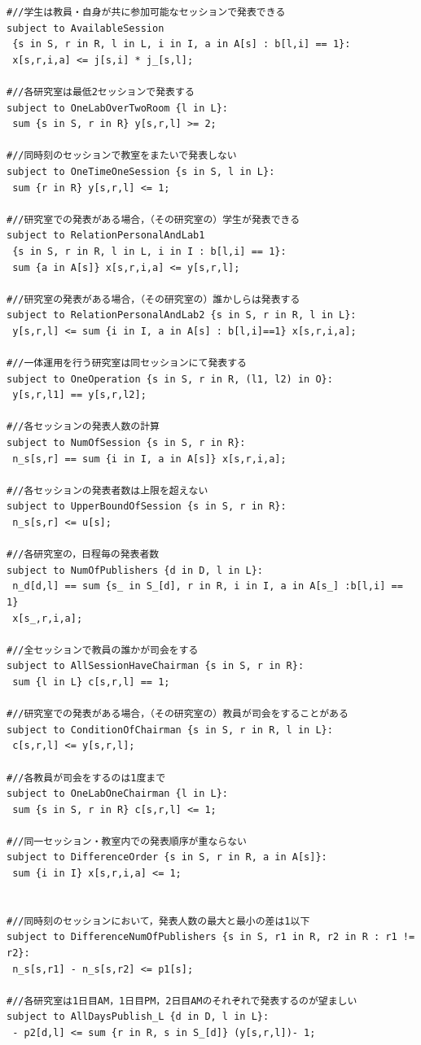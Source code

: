 \documentclass[a4paper,12pt,fleqn]{jarticle}
\begin{document}
\begin{verbatim}
#//学生は教員・自身が共に参加可能なセッションで発表できる
subject to AvailableSession
 {s in S, r in R, l in L, i in I, a in A[s] : b[l,i] == 1}:
 x[s,r,i,a] <= j[s,i] * j_[s,l];

#//各研究室は最低2セッションで発表する
subject to OneLabOverTwoRoom {l in L}:
 sum {s in S, r in R} y[s,r,l] >= 2;

#//同時刻のセッションで教室をまたいで発表しない
subject to OneTimeOneSession {s in S, l in L}:
 sum {r in R} y[s,r,l] <= 1;

#//研究室での発表がある場合，（その研究室の）学生が発表できる
subject to RelationPersonalAndLab1
 {s in S, r in R, l in L, i in I : b[l,i] == 1}:
 sum {a in A[s]} x[s,r,i,a] <= y[s,r,l];

#//研究室の発表がある場合，（その研究室の）誰かしらは発表する
subject to RelationPersonalAndLab2 {s in S, r in R, l in L}:
 y[s,r,l] <= sum {i in I, a in A[s] : b[l,i]==1} x[s,r,i,a];

#//一体運用を行う研究室は同セッションにて発表する
subject to OneOperation {s in S, r in R, (l1, l2) in O}:
 y[s,r,l1] == y[s,r,l2];

#//各セッションの発表人数の計算
subject to NumOfSession {s in S, r in R}:
 n_s[s,r] == sum {i in I, a in A[s]} x[s,r,i,a];

#//各セッションの発表者数は上限を超えない
subject to UpperBoundOfSession {s in S, r in R}:
 n_s[s,r] <= u[s];

#//各研究室の，日程毎の発表者数
subject to NumOfPublishers {d in D, l in L}:
 n_d[d,l] == sum {s_ in S_[d], r in R, i in I, a in A[s_] :b[l,i] == 1}
 x[s_,r,i,a];

#//全セッションで教員の誰かが司会をする
subject to AllSessionHaveChairman {s in S, r in R}:
 sum {l in L} c[s,r,l] == 1;

#//研究室での発表がある場合，（その研究室の）教員が司会をすることがある
subject to ConditionOfChairman {s in S, r in R, l in L}:
 c[s,r,l] <= y[s,r,l];

#//各教員が司会をするのは1度まで
subject to OneLabOneChairman {l in L}:
 sum {s in S, r in R} c[s,r,l] <= 1;

#//同一セッション・教室内での発表順序が重ならない
subject to DifferenceOrder {s in S, r in R, a in A[s]}:
 sum {i in I} x[s,r,i,a] <= 1;

	
#//同時刻のセッションにおいて，発表人数の最大と最小の差は1以下
subject to DifferenceNumOfPublishers {s in S, r1 in R, r2 in R : r1 != r2}:
 n_s[s,r1] - n_s[s,r2] <= p1[s];

#//各研究室は1日目AM，1日目PM，2日目AMのそれぞれで発表するのが望ましい
subject to AllDaysPublish_L {d in D, l in L}:
 - p2[d,l] <= sum {r in R, s in S_[d]} (y[s,r,l])- 1;


\end{verbatim}
\end{document}
